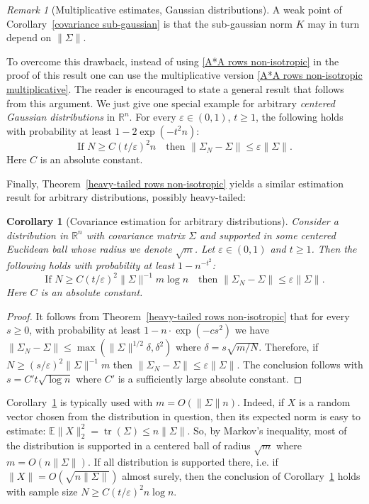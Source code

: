 \documentclass[10pt, openany]{book}
\newtheorem{corollary}[theorem]{Corollary}
\theoremstyle{remark}
\newtheorem{remark}[theorem]{Remark}
\DeclareMathOperator{\tr}{tr}
\def \R {\mathbb{R}}
\def \E {\mathbb{E}}
\def \e {\varepsilon}
\def \d {\delta}
\begin{document}
\begin{remark}[Multiplicative estimates, Gaussian distributions]
  A weak point of Corollary~\ref{covariance sub-gaussian} 
  is that the sub-gaussian norm $K$ may in turn depend on $\|\Sigma\|$.
    
  To overcome this drawback, instead of using \eqref{A*A rows non-isotropic}
  in the proof of this result one can use the multiplicative version \eqref{A*A rows non-isotropic multiplicative}.
  The reader is encouraged to state a general result that follows from this argument.
  We just give one special example for arbitrary {\em centered Gaussian distributions} in $\R^n$.
  For every $\e \in (0,1)$, $t \ge 1$, the following holds with probability at least $1 - 2 \exp(- t^2 n)$:
  $$
  \text{If } N \ge C(t/\e)^2 n \quad \text{then } \|\Sigma_N - \Sigma\| \le \e \|\Sigma\|.
  $$
  Here $C$ is an absolute constant. 
\end{remark}

Finally, Theorem~\ref{heavy-tailed rows non-isotropic} yields a similar estimation result for arbitrary distributions,
possibly heavy-tailed:

\begin{corollary}[Covariance estimation for arbitrary distributions]	\label{covariance heavy-tailed} \hfill
  Consider a distribution in $\R^n$ with covariance matrix $\Sigma$ and supported in 
  some centered Euclidean ball whose radius we denote $\sqrt{m}$.
  Let $\e \in (0,1)$ and $t \ge 1$. 
  Then the following holds with probability at least $1 - n^{-t^2}$:
  $$
  \text{If } N \ge C(t/\e)^2 \|\Sigma\|^{-1} m \log n 
  \quad \text{then } \|\Sigma_N - \Sigma\| \le \e \|\Sigma\|.
  $$
  Here $C$ is an absolute constant.
\end{corollary}

\begin{proof}
It follows from Theorem~\ref{heavy-tailed rows non-isotropic} that for every $s \ge 0$, 
with probability at least $1 - n \cdot \exp(-cs^2)$ we have
$\|\Sigma_N-\Sigma\| \le \max(\|\Sigma\|^{1/2}\d, \d^2)$
where $\d = s \sqrt{m/N}$.
Therefore, if $N \ge (s/\e)^2 \|\Sigma\|^{-1} m$ then $\|\Sigma_N - \Sigma\| \le \e \|\Sigma\|$.
The conclusion follows with $s = C' t \sqrt{\log n}$ where $C'$ is a sufficiently large 
absolute constant.
\end{proof}

Corollary~\ref{covariance heavy-tailed} is typically used with $m = O(\|\Sigma\| n)$. 
Indeed, if $X$ is a random vector chosen from the distribution in question, 
then its expected norm is easy to estimate: 
$\E \|X\|_2^2  = \tr(\Sigma) \le n \|\Sigma\|$. 
So, by Markov's inequality, most of the distribution is supported
in a centered ball of radius $\sqrt{m}$ where $m = O(n \|\Sigma\|)$. 
If all distribution is supported there, i.e. if $\|X\| = O(\sqrt{n \|\Sigma\|})$ almost surely, 
then the conclusion of Corollary~\ref{covariance heavy-tailed} holds 
with sample size $N \ge C(t/\e)^2 n \log n$.
\end{document}
